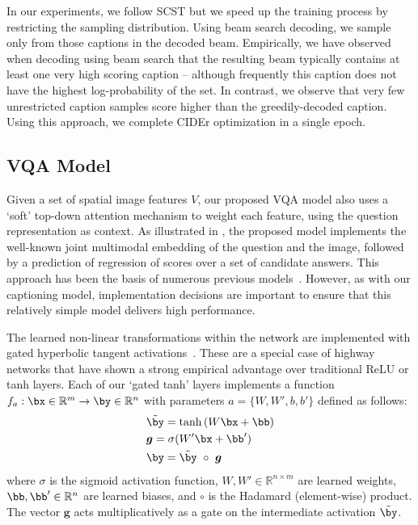 \documentclass[10pt,twocolumn,letterpaper]{article}
\begin{document}
In our experiments, we follow SCST but we speed up the training process by restricting the sampling distribution. Using beam search decoding, we sample only from those captions in the decoded beam. Empirically, we have observed when decoding using beam search that the resulting beam typically contains at least one very high scoring caption -- although frequently this caption does not have the highest log-probability of the set. In contrast, we observe that very few unrestricted caption samples score higher than the greedily-decoded caption. Using this approach, we complete CIDEr optimization in a single epoch.

\subsection{VQA Model}
\label{sec:vqa}

Given a set of spatial image features $V$, our proposed VQA model also uses a `soft' top-down attention mechanism to weight each feature, using the question representation as context. As illustrated in , the proposed model implements the well-known joint multimodal embedding of the question and the image, followed by a prediction of regression of scores over a set of candidate answers. This approach has been the basis of numerous previous models~\cite{jabri2016revisiting,kazemi2017baseline,teney2016zsvqa}. However, as with our captioning model, implementation decisions are important to ensure that this relatively simple model delivers high performance.

The learned non-linear transformations within the network are implemented with gated hyperbolic tangent activations~\cite{dauphin2016languagecnn}. These are a special case of highway networks \cite{srivastava2015highway} that have shown a strong empirical advantage over traditional ReLU or tanh layers. Each of our `gated tanh' layers implements a function $f_a:\bx \in \mathbb{R}^{m} \to \by \in \mathbb{R}^{n}$ with parameters $a = \{W, W', b, b'\}$ defined as follows:
\begin{align}
  \label{eq:nonLinearBlock}
  & \tilde{\by} = \tanh\,(W \bx + \bb )\\
  & \boldsymbol{g} = \sigma( W' \bx + \bb' )\\
  & \by = \tilde{\by} ~\circ~ \boldsymbol{g}
\end{align}
\noindent
where $\sigma$ is the sigmoid activation function, $W, W' \in \mathbb{R}^{n \times m}$ are learned weights, $\bb, \bb' \in \mathbb{R}^{n}$ are learned biases, and $\circ$ is the Hadamard (element-wise) product. The vector $\boldsymbol{g}$ acts multiplicatively as a gate on the intermediate activation $\tilde{\by}$.
\end{document}
